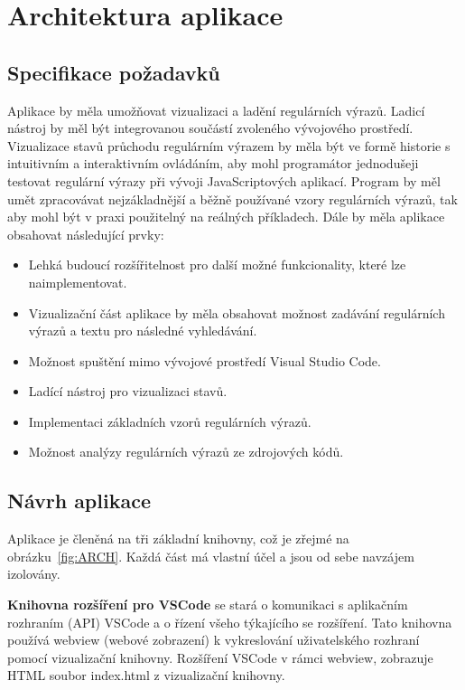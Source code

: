 \chapter{Architektura aplikace}\label{sec:ApplicationTechnology}

\section{Specifikace požadavků}

Aplikace by měla umožňovat vizualizaci a ladění regulárních výrazů.
Ladicí nástroj by měl být integrovanou součástí zvoleného vývojového prostředí.
Vizualizace stavů průchodu regulárním výrazem by měla být ve formě historie s intuitivním a interaktivním ovládáním, aby mohl programátor jednodušeji testovat regulární výrazy při vývoji JavaScriptových aplikací.
Program by měl umět zpracovávat nejzákladnější a běžně používané vzory regulárních výrazů, tak aby mohl být v praxi použitelný na reálných příkladech.
Dále by měla aplikace obsahovat následující prvky:
\begin{itemize}
	\item Lehká budoucí rozšířitelnost pro další možné funkcionality, které lze naimplementovat.
	\item Vizualizační část aplikace by měla obsahovat možnost zadávání regulárních výrazů a textu pro následné vyhledávání.
	\item Možnost spuštění mimo vývojové prostředí Visual Studio Code.
	\item Ladící nástroj pro vizualizaci stavů.
	\item Implementaci základních vzorů regulárních výrazů.
	\item Možnost analýzy regulárních výrazů ze zdrojových kódů.
\end{itemize}

\section{Návrh aplikace}

Aplikace je členěná na tři základní knihovny, což je zřejmé na obrázku~\ref{fig:ARCH}.
Každá část má vlastní účel a jsou od sebe navzájem izolovány.

\textbf{Knihovna rozšíření pro VSCode} se stará o komunikaci s aplikačním rozhraním (API) VSCode a o řízení všeho týkajícího se rozšíření.
Tato knihovna používá webview (webové zobrazení) k vykreslování uživatelského rozhraní pomocí vizualizační knihovny.
Rozšíření VSCode v rámci webview, zobrazuje HTML soubor index.html z vizualizační knihovny.

